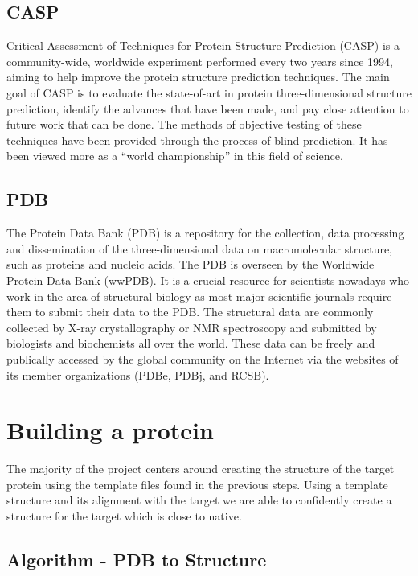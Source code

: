 \documentclass{article}
\begin{document}
\subsection{CASP}

Critical Assessment of Techniques for Protein Structure Prediction (CASP) is a community-wide, worldwide experiment performed every two years since 1994, aiming to help improve the protein structure prediction techniques. The main goal of CASP is to evaluate the state-of-art in protein three-dimensional structure prediction, identify the advances that have been made, and pay close attention to future work that can be done. The methods of objective testing of these techniques have been provided through the process of blind prediction. It has been viewed more as a “world championship” in this field of science. 
\subsection{PDB}

The Protein Data Bank (PDB) is a repository for the collection, data processing and dissemination of the three-dimensional data on macromolecular structure, such as proteins and nucleic acids. The PDB is overseen by the Worldwide Protein Data Bank (wwPDB). It is a crucial resource for scientists nowadays who work in the area of structural biology as most major scientific journals require them to submit their data to the PDB. The structural data are commonly collected by X-ray crystallography or NMR spectroscopy and submitted by biologists and biochemists all over the world. These data can be freely and publically accessed by the global community on the Internet via the websites of its member organizations (PDBe, PDBj, and RCSB). 

\section{Building a protein}

The majority of the project centers around creating the structure of the target protein using the template files found in the previous steps. Using a template structure and its alignment with the target we are able to confidently create a structure for the target which is close to native.
\subsection{Algorithm - PDB to Structure}
\end{document}
